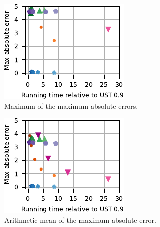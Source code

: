 \begin{figure}[tb]
\begin{subfigure}{.3\textwidth}
\centering
\includegraphics[width=\textwidth]{sources/plots/el-clos/abs-errors.pdf}
\caption{Maximum of the maximum absolute errors.}
\label{fig:el-clos:el-clos-max-abs}
\end{subfigure}\hfill
\begin{subfigure}{.3\textwidth}
\centering
\includegraphics[width=\textwidth]{sources/plots/el-clos/avg-abs-errors.pdf}
\caption{Arithmetic mean of the maximum absolute error.}
\label{fig:el-clos:el-clos-avg-abs}
\end{subfigure}\hfill
\begin{subfigure}{.3\textwidth}

\end{subfigure}
\end{figure}
